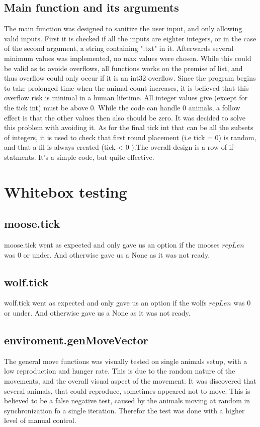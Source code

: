 \documentclass{article}
\begin{document}
     \subsection{Main function and its arguments}
    The main function was designed to sanitize the user input, and only allowing valid inputs. First it is checked if all the inputs are eighter integers, or in the case of the second argument, a string containing ".txt" in it. \newline Afterwards several minimum values was implemented, no max values were chosen. While this could be valid as to avoide overflows, all functions works on the premise of list, and thus overflow could only occur if it is an int32 overflow. Since the program begins to take prolonged time when the animal count increases, it is believed that this overflow risk is minimal in a human lifetime. All integer values give (except for the tick int) must be above 0. \newline While the code can handle 0 animals, a follow effect is that the other values then also should be zero. It was decided to solve this problem with avoiding it. As for the final tick int that can be all the subsets of integers, it is used to check that first round placement (i.e tick = 0) is random, and that a fil is always created (tick < 0 ).\newline The overall design is a row of if-statments. It's a simple code, but quite effective. 

         
\section{Whitebox testing}
    \subsection{moose.tick}
    moose.tick went as expected and only gave us an option if the mooses $repLen$ was 0 or under. And otherwise gave us a None as it was not ready.
    
    \subsection{wolf.tick}
    wolf.tick went as expected and only gave us an option if the wolfs $repLen$ was 0 or under. And otherwise gave us a None as it was not ready.
    
    \subsection{enviroment.genMoveVector}
    The general move functions was visually tested on single animals setup, with a low reproduction and hunger rate. This is due to the random nature of the movements, and the overall visual aspect of the movement. It was discovered that several animals, that could reproduce, sometimes appeared not to move. This is believed to be a false negative test, caused by the animals moving at random in synchronization fo a single iteration. Therefor the test was done with a higher level of manual control. \newline
    
\end{document}
